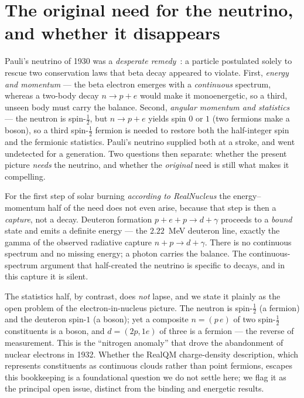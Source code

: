 \documentclass[11pt]{article}
\begin{document}
\section{The original need for the neutrino, and whether it disappears}

Pauli's neutrino of 1930 was a \emph{desperate remedy}~\cite{Pauli}: a particle postulated solely to
rescue two conservation laws that beta decay appeared to violate. First, \emph{energy and momentum} ---
the beta electron emerges with a \emph{continuous} spectrum, whereas a two-body decay $n\to p+e$ would
make it monoenergetic, so a third, unseen body must carry the balance. Second, \emph{angular momentum
and statistics} --- the neutron is spin-$\tfrac12$, but $n\to p+e$ yields spin $0$ or $1$ (two fermions
make a boson), so a third spin-$\tfrac12$ fermion is needed to restore both the half-integer spin and
the fermionic statistics. Pauli's neutrino supplied both at a stroke, and went undetected for a
generation. Two questions then separate: whether the present picture \emph{needs} the neutrino, and
whether the \emph{original} need is still what makes it compelling.

For the first step of solar burning \emph{according to RealNucleus} the energy--momentum half of the
need does not even arise, because that step is then a \emph{capture}, not a decay. Deuteron formation $p+e+p\to d+\gamma$ proceeds to a
\emph{bound} state and emits a definite energy --- the $2.22$~MeV deuteron line, exactly the gamma of
the observed radiative capture $n+p\to d+\gamma$. There is no continuous spectrum and no missing
energy; a photon carries the balance. The continuous-spectrum argument that half-created the neutrino
is specific to decays, and in this capture it is silent.

The statistics half, by contrast, does \emph{not} lapse, and we state it plainly as the open problem of
the electron-in-nucleus picture. The neutron is spin-$\tfrac12$ (a fermion) and the deuteron spin-$1$ (a
boson); yet a composite $n=(p\,e)$ of two spin-$\tfrac12$ constituents is a boson, and $d=(2p,1e)$ of
three is a fermion --- the reverse of measurement. This is the ``nitrogen anomaly'' that drove the
abandonment of nuclear electrons in 1932. Whether the RealQM charge-density description, which
represents constituents as continuous clouds rather than point fermions, escapes this bookkeeping is a
foundational question we do not settle here; we flag it as the principal open issue, distinct from the
binding and energetic results.
\end{document}
